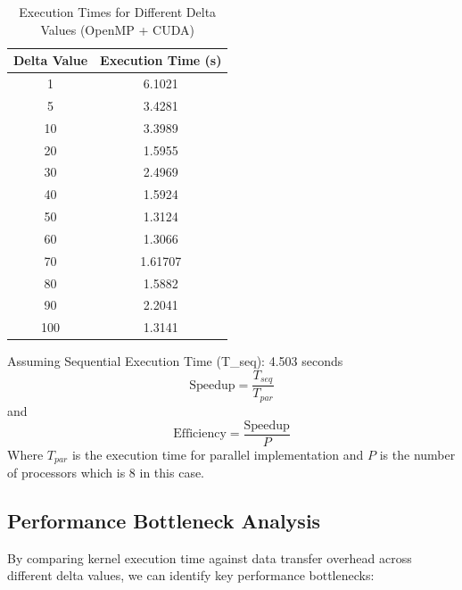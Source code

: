 \documentclass{article}
\begin{document}
\begin{table}[ht]
    \centering
    \caption{Execution Times for Different Delta Values (OpenMP + CUDA)}
    \begin{tabular}{|c|c|}
        \hline
        \textbf{Delta Value} & \textbf{Execution Time (s)} \\
        \hline
        1 & 6.1021 \\
        \hline
        5 & 3.4281 \\
        \hline
        10 & 3.3989 \\
        \hline
        20 & 1.5955 \\
        \hline
        30 & 2.4969 \\
        \hline
        40 & 1.5924 \\
        \hline
        50 & 1.3124 \\
        \hline
        60 & 1.3066 \\
        \hline
        70 & 1.61707 \\
        \hline
        80 & 1.5882 \\
        \hline
        90 & 2.2041 \\
        \hline
        100 & 1.3141 \\
        \hline
    \end{tabular}
    \label{tab:delta_timing}

    Assuming Sequential Execution Time (T\_seq): 4.503 seconds
    \begin{equation}
        \text{Speedup} = \frac{T_{seq}}{T_{par}}
    \end{equation}
    and 
    \begin{equation}
        \text{Efficiency} = \frac{\text{Speedup}}{P}
    \end{equation}
    Where $T_{par}$ is the execution time for parallel implementation and $P$ is the number of processors which is 8 in this case.
\end{table}

\subsection*{Performance Bottleneck Analysis}

By comparing kernel execution time against data transfer overhead across different delta values, we can identify key performance bottlenecks:
\end{document}
